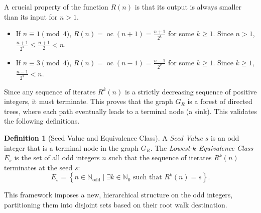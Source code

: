 \documentclass[12pt]{article}
\theoremstyle{plain}
\theoremstyle{definition}
\newtheorem{definition}[theorem]{Definition}
\begin{document}
A crucial property of the function $R(n)$ is that its output is always smaller than its input for $n > 1$.

\begin{itemize}
    \item If $n \equiv 1 \pmod{4}$, $R(n) = \operatorname{oc}(n+1) = \frac{n+1}{2^k}$ for some $k \geq 1$. Since $n > 1$, $\frac{n+1}{2^k} \leq \frac{n+1}{2} < n$.
    \item If $n \equiv 3 \pmod{4}$, $R(n) = \operatorname{oc}(n-1) = \frac{n-1}{2^k}$ for some $k \geq 1$. Since $k \geq 1$, $\frac{n-1}{2^k} < n$.
\end{itemize}

Since any sequence of iterates $R^k(n)$ is a strictly decreasing sequence of positive integers, it must terminate. This proves that the graph $G_R$ is a forest of directed trees, where each path eventually leads to a terminal node (a sink). This validates the following definitions.

\begin{definition}[Seed Value and Equivalence Class]
A \emph{Seed Value} $s$ is an odd integer that is a terminal node in the graph $G_R$. The \emph{Lowest-$k$ Equivalence Class} $E_s$ is the set of all odd integers $n$ such that the sequence of iterates $R^k(n)$ terminates at the seed $s$:
\[
E_s = \left\{ n \in \mathbb{N}_{\text{odd}} \mid \exists k \in \mathbb{N}_0 \text{ such that } R^k(n) = s \right\}.
\]
\end{definition}

This framework imposes a new, hierarchical structure on the odd integers, partitioning them into disjoint sets based on their root walk destination.


\newpage


\begin{thebibliography}{9}

\end{thebibliography}
\end{document}
